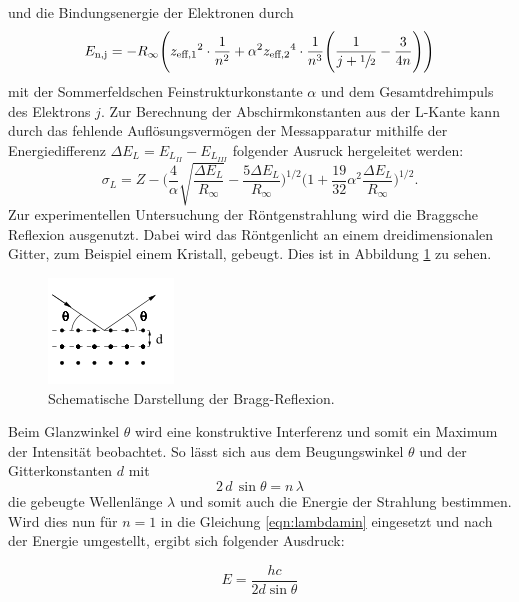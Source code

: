 und die Bindungsenergie der Elektronen durch
\begin{equation}
  E_\text{n,j} = - R_{\infty} \Biggl({z_\text{eff,1}}^2 \cdot \frac{1}{n^2} + {\alpha}^2 {z_\text{eff,2}}^4 \cdot \frac{1}{n^3} \Biggl(\frac{1}{j+\sfrac{1}{2}} - \frac{3}{4n} \Biggr) \Biggr)
  \label{eqn:feinstruktur}
\end{equation}
mit der Sommerfeldschen Feinstrukturkonstante $\alpha$ und dem Gesamtdrehimpuls des Elektrons $j$.
Zur Berechnung der Abschirmkonstanten aus der L-Kante kann durch das fehlende Auflösungsvermögen der Messapparatur mithilfe der Energiedifferenz $\Delta E_L = E_{L_{II}}- E_{L_{III}}$ folgender
Ausruck hergeleitet werden:
\begin{equation}
{\sigma}_L = Z - \Biggl(\frac{4}{\alpha} \sqrt{\frac{\Delta E_L}{R_{\infty}}} - \frac{5 \Delta E_L}{R_{\infty}} \Biggr)^{1/2} \Biggl(1+ \frac{19}{32} {\alpha}^2 \frac{\Delta E_L}{R_{\infty}} \Biggr)^{1/2} .
\label{eqn:sigmaL}
\end{equation}
Zur experimentellen Untersuchung der Röntgenstrahlung wird die Braggsche Reflexion ausgenutzt. Dabei wird das Röntgenlicht an einem dreidimensionalen Gitter, zum Beispiel einem Kristall, gebeugt.
Dies ist in Abbildung \ref{fig:braggreflexion} zu sehen.
\begin{figure}
  \centering
  \includegraphics{images/bragg.png}
  \caption{Schematische Darstellung der Bragg-Reflexion.\cite{sample}}
  \label{fig:braggreflexion}
\end{figure}
Beim Glanzwinkel $\theta$ wird eine konstruktive Interferenz und somit ein Maximum der Intensität beobachtet. So lässt sich aus dem Beugungswinkel $\theta$ und der Gitterkonstanten $d$ mit
\begin{equation}
  2 \, d \, \sin{\theta} = n \, \lambda
  \label{eqn:bragg}
\end{equation}
die gebeugte Wellenlänge $\lambda$ und somit auch die Energie der Strahlung bestimmen.
Wird dies nun für $n = 1$ in die Gleichung \eqref{eqn:lambdamin} eingesetzt und nach der Energie umgestellt, ergibt sich folgender Ausdruck:

\begin{equation}
  E = \frac{h c}{2 d \sin{\theta}}
  \label{eqn:Energie}
\end{equation}
